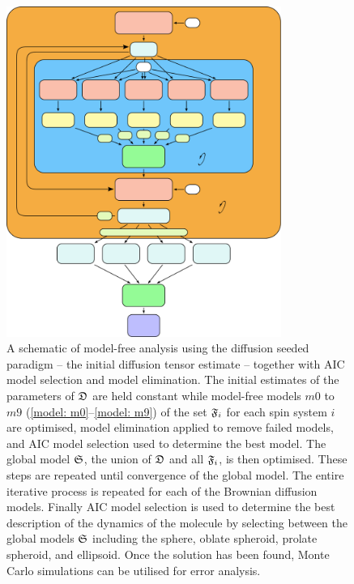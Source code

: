 \begin{htmlonly}
\begin{htmlonly}
\begin{figure}
\centerline{\includegraphics[width=0.8\textwidth, bb=0 0 437 523]{images/model_free/init_diff_est}}
\caption[Model-free analysis using the diffusion seeded paradigm]{A schematic of model-free analysis using the diffusion seeded paradigm -- the initial diffusion tensor estimate -- together with AIC model selection and model elimination.  The initial estimates of the parameters of $\mathfrak{D}$ are held constant while model-free models $m0$ to $m9$ (\ref{model: m0}--\ref{model: m9}) of the set $\mathfrak{F}_i$ for each spin system $i$ are optimised, model elimination applied to remove failed models, and AIC model selection used to determine the best model.  The global model $\mathfrak{S}$, the union of $\mathfrak{D}$ and all $\mathfrak{F}_i$, is then optimised.  These steps are repeated until convergence of the global model.  The entire iterative process is repeated for each of the Brownian diffusion models.  Finally AIC model selection is used to determine the best description of the dynamics of the molecule by selecting between the global models $\mathfrak{S}$ including the sphere, oblate spheroid, prolate spheroid, and ellipsoid.  Once the solution has been found, Monte Carlo simulations can be utilised for error analysis.} \label{fig: init diff estimate}
\end{figure}


\end{htmlonly}
\end{htmlonly}
